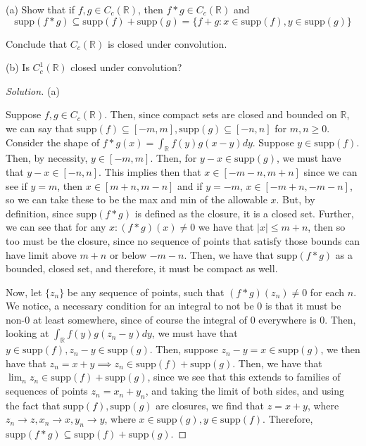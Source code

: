 \documentclass[10pt]{article}
\newcommand{\supp}{{\text{supp}}}
\newenvironment{problem}[2][Problem]{\begin{trivlist}
\item[\hskip \labelsep {\bfseries #1}\hskip \labelsep {\bfseries #2.}]}{\end{trivlist}}
\begin{document}
\begin{problem}{4.6.28}

(a) Show that if $f,g \in C_c(\mathbb{R})$, then $f \ast g \in C_c(\mathbb{R})$ and $$\supp(f \ast g) \subseteq \supp(f) + \supp(g) = \{ f + g : x \in \supp(f), y \in \supp(g) \}$$

Conclude that $C_c(\mathbb{R})$ is closed under convolution.

(b) Is $C_c^1(\mathbb{R})$ closed under convolution?

\end{problem}

\begin{proof}[Solution]

(a)

Suppose $f,g \in C_c(\mathbb{R})$. Then, since compact sets are closed and bounded on $\mathbb{R}$, we can say that $\supp(f) \subseteq [-m,m], \supp(g) \subseteq [-n,n]$ for $m,n \geq 0$. Consider the shape of $f \ast g(x) = \int_\mathbb{R} f(y)  g(x-y) dy$. Suppose $y \in \supp(f)$. Then, by necessity, $y \in [-m,m]$. Then, for $y-x \in \supp(g)$, we must have that $y-x \in [-n,n]$. This implies then that $x \in [-m-n, m+n]$ since we can see if $y = m$, then $x \in [m+n, m-n]$ and if $y = -m$, $x\in [-m+n, -m-n]$, so we can take these to be the max and min of the allowable $x$. But, by definition, since $\supp(f \ast g)$ is defined as the closure, it is a closed set. Further, we can see that for any $x : (f \ast g)(x) \not = 0$ we have that $|x| \leq m+n$, then so too must be the closure, since no sequence of points that satisfy those bounds can have limit above $m+n$ or below $-m-n$. Then, we have that $\supp(f\ast g)$ as a bounded, closed set, and therefore, it must be compact as well.

Now, let $\{ z_n \}$ be any sequence of points, such that $(f \ast g)(z_n) \not = 0$ for each $n$. We notice, a necessary condition for an integral to not be 0 is that it must be non-0 at least somewhere, since of course the integral of 0 everywhere is 0. Then, looking at $ \int_\mathbb{R} f(y)  g(z_n-y) dy$, we must have that $y \in \supp(f), z_n - y \in \supp(g)$. Then, suppose $z_n - y = x \in \supp(g)$, we then have that $z_n = x + y \implies z_n \in \supp(f) + \supp(g)$. Then, we have that $\lim_n z_n \in \supp(f) + \supp(g)$, since we see that this extends to families of sequences of points $z_n = x_n + y_n$, and taking the limit of both sides, and using the fact that $\supp(f),\supp(g)$ are closures, we find that $z = x + y$, where $z_n \to z, x_n \to x, y_n \to y$, where $x \in \supp(g), y \in \supp(f)$. Therefore, $\supp(f \ast g) \subseteq \supp(f) + \supp(g)$.


\end{proof}
\end{document}
